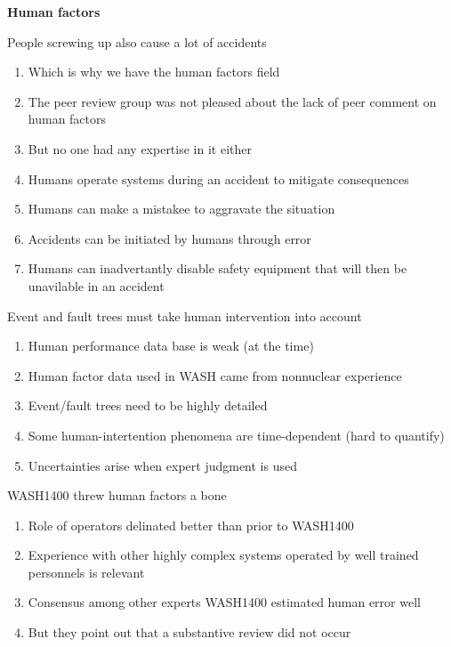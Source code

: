 \documentclass[aspectratio=1610,pdftex,dvipsnames,compress,xcolor={dvipsnames}]{beamer}
\begin{document}
\begin{frame}[plain]{}
    \centering\LARGE\textbf{Human factors}
\end{frame}


\addtocounter{framenumber}{-1}
\begin{frame}{People screwing up also cause a lot of accidents}
    \begin{enumerate}[series=outerlist,topsep=0pt,itemsep=7pt,leftmargin=*,label=(\arabic*)]
        \item[]Which is why we have the human factors field
        \item[]The peer review group was not pleased about the lack of peer comment on human factors
        \item[]But no one had any expertise in it either 
            \vspace{0.10in}
        \item Humans operate systems during an accident to mitigate consequences
        \item Humans can make a mistakee to aggravate the situation
        \item Accidents can be initiated by humans through error
        \item Humans can inadvertantly disable safety equipment that will then be unavilable in an accident
    \end{enumerate}
\end{frame}


\begin{frame}{Event and fault trees must take human intervention into account}
    \begin{enumerate}[series=outerlist,topsep=0pt,itemsep=21pt,leftmargin=*,label=(\arabic*)]
        \item Human performance data base is weak (at the time)
        \item Human factor data used in WASH came from nonnuclear experience
        \item Event/fault trees need to be highly detailed
        \item Some human-intertention phenomena are time-dependent (hard to quantify)
        \item Uncertainties arise when expert judgment is used 
    \end{enumerate}
\end{frame}


\begin{frame}{WASH1400 threw human factors a bone}
    \begin{enumerate}[series=outerlist,topsep=0pt,itemsep=21pt,leftmargin=*,label=(\arabic*)]
        \item Role of operators delinated better than prior to WASH1400
        \item Experience with other highly complex systems operated by well trained personnels is relevant
        \item Consensus among other experts WASH1400 estimated human error well
        \item[]But they point out that a substantive review did not occur
    \end{enumerate}
\end{frame}
\end{document}
